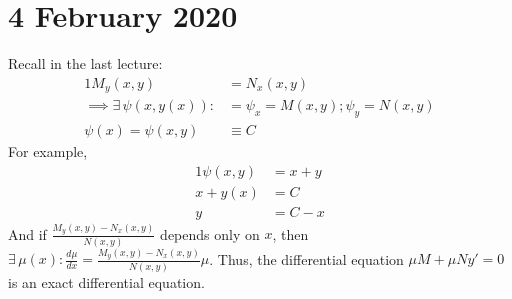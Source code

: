 \documentclass[diffeq.tex]{subfiles}
\begin{document}
\chapter{4 February 2020}
    Recall in the last lecture:
    \begin{alignat}{1}
        M_{y}(x, y) &= N_{x}(x, y)\\
        \implies \exists\,\psi(x, y(x)):&= \psi_{x}=M(x,y); \psi_{y}=N(x, y)\\
        \psi(x) = \psi(x, y) &\equiv C
    \end{alignat}
    For example,
    \begin{alignat}{1}
        \psi(x, y) &= x + y\\
        x + y(x) &= C\\
        y &= C - x
    \end{alignat}
    And if $\frac{M_{y}(x, y) - N_{x}(x, y)}{N(x, y)}$ depends only on $x$, then $\exists\,\mu(x): \frac{d\mu}{dx} = \frac{M_{y}(x, y) - N_{x}(x, y)}{N(x, y)}\mu$. Thus, the differential equation $\mu M + \mu Ny' = 0$ is an exact differential equation.
\end{document}
